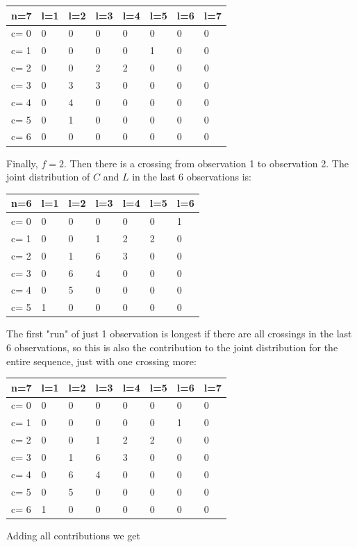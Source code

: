 \begin{tabular}{l | l l l l l l l}
\hline
n=7&l=1&l=2&l=3&l=4&l=5&l=6&l=7\\
\hline
c= 0& 0& 0& 0& 0& 0& 0& 0\\
c= 1& 0& 0& 0& 0& 1& 0& 0\\
c= 2& 0& 0& 2& 2& 0& 0& 0\\
c= 3& 0& 3& 3& 0& 0& 0& 0\\
c= 4& 0& 4& 0& 0& 0& 0& 0\\
c= 5& 0& 1& 0& 0& 0& 0& 0\\
c= 6& 0& 0& 0& 0& 0& 0& 0\\
\hline
\end{tabular}


Finally, $f=2$. Then there is a crossing from observation 1 to observation 2. The joint distribution of $C$ and $L$ in the last 6 observations is:

\begin{tabular}{l | l l l l l l}
\hline
n=6&l=1&l=2&l=3&l=4&l=5&l=6\\
\hline
c= 0& 0& 0& 0& 0& 0& 1\\
c= 1& 0& 0& 1& 2& 2& 0\\
c= 2& 0& 1& 6& 3& 0& 0\\
c= 3& 0& 6& 4& 0& 0& 0\\
c= 4& 0& 5& 0& 0& 0& 0\\
c= 5& 1& 0& 0& 0& 0& 0\\
\hline
\end{tabular}

The first "run" of just 1 observation is longest if there are all crossings in the last 6 observations, so this is also the contribution to the joint distribution for the entire sequence, just with one crossing more: 

\begin{tabular}{l | l l l l l l l}
\hline
n=7&l=1&l=2&l=3&l=4&l=5&l=6&l=7\\
\hline
c= 0& 0& 0& 0& 0& 0& 0& 0\\
c= 1& 0& 0& 0& 0& 0& 1& 0\\
c= 2& 0& 0& 1& 2& 2& 0& 0\\
c= 3& 0& 1& 6& 3& 0& 0& 0\\
c= 4& 0& 6& 4& 0& 0& 0& 0\\
c= 5& 0& 5& 0& 0& 0& 0& 0\\
c= 6& 1& 0& 0& 0& 0& 0& 0\\
\hline
\end{tabular}

Adding all contributions we get


